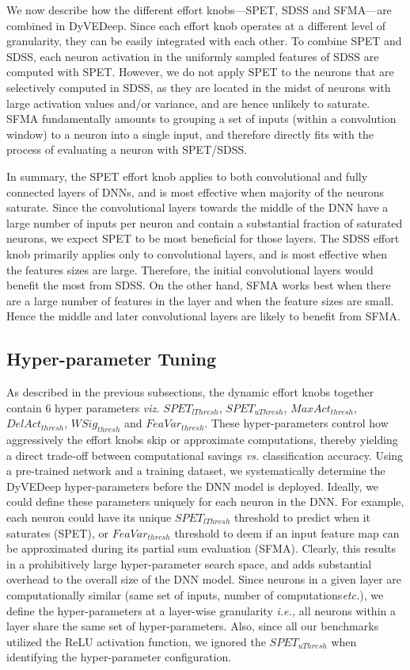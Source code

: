\documentclass{article} %
\begin{document}
We now describe how the different effort knobs---SPET, SDSS and SFMA---are combined in DyVEDeep. Since each effort knob operates at a different level of granularity, they can be easily integrated with each other. To combine SPET and SDSS, each neuron activation in the uniformly sampled features of SDSS are computed with SPET. However, we do not apply SPET to the neurons that are selectively computed in SDSS, as they are located in the midst of neurons with large activation values and/or variance, and are hence unlikely to saturate. SFMA fundamentally amounts to grouping a set of inputs (within a convolution window) to a neuron into a single input, and therefore directly fits with the process of evaluating a neuron with SPET/SDSS.

In summary, the SPET effort knob applies to both convolutional and fully connected layers of DNNs, and is most effective when majority of the neurons saturate. Since the convolutional layers towards the middle of the DNN have a large number of inputs per neuron and contain a substantial fraction of saturated neurons, we expect SPET to be most beneficial for those layers. The SDSS effort knob primarily applies only to convolutional layers, and is most effective when the features sizes are large. Therefore, the initial convolutional layers would benefit the most from SDSS. On the other hand, SFMA works best when there are a large number of features in the layer and when the feature sizes are small. Hence the middle and later convolutional layers are likely to benefit from SFMA.

\subsection{Hyper-parameter Tuning}

As described in the previous subsections, the dynamic effort knobs together contain 6 hyper parameters \emph{viz.} $SPET_{lThresh}$, $SPET_{uThresh}$, $MaxAct_{thresh}$, $DelAct_{thresh}$, $WSig_{thresh}$ and $FeaVar_{thresh}$. These hyper-parameters control how aggressively the effort knobs skip or approximate computations, thereby yielding a direct trade-off between computational savings \emph{vs.} classification accuracy. Using a pre-trained network and a training dataset, we systematically determine the DyVEDeep hyper-parameters before the DNN model is deployed. Ideally, we could define these parameters uniquely for each neuron in the DNN. For example, each neuron could have its unique $SPET_{lThresh}$ threshold to predict when it saturates (SPET), or $FeaVar_{thresh}$ threshold to deem if an input feature map can be approximated during its partial sum evaluation (SFMA). Clearly, this results in a prohibitively large hyper-parameter search space, and adds substantial overhead to the overall size of the DNN model. Since neurons in a given layer are computationally similar (same set of inputs, number of computations\emph{etc.}), we define the hyper-parameters at a layer-wise granularity \emph{i.e.,} all neurons within a layer share the same set of hyper-parameters. Also, since all our benchmarks utilized the ReLU activation function, we ignored the $SPET_{uThresh}$ when identifying the hyper-parameter configuration. 
\end{document}

